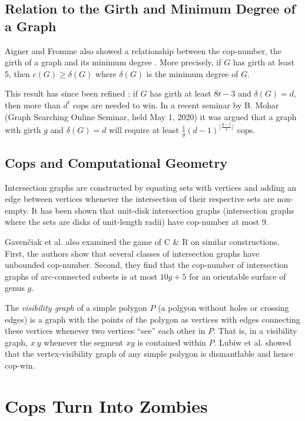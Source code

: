 \subsection{Relation to the Girth and Minimum Degree of a Graph}

Aigner and Fromme also showed a relationship between the cop-number, the girth of a graph and
its minimum degree \cite{aigner1984game}. More precisely, if $G$ has girth at least 5, then $c(G)\geq \delta(G)$ where $\delta(G)$ is the minimum degree of $G$.

This result has since been refined \cite{frankl1987cops}: if $G$ has girth at least $8t-3$ and $\delta(G) = d$, then more than $d^t$ cops are needed to win. In a recent
seminar by B. Mohar (Graph Searching Online Seminar, held May 1, 2020) it was
argued that a graph with girth $g$ and $\delta(G)=d$ will require at least $\tfrac{1}{g}(d-1)^{\lfloor \frac{g-1}{4} \rfloor}$ cops.

\subsection{Cops and Computational Geometry}

Intersection graphs are constructed by equating sets with vertices and adding an edge between vertices whenever the intersection of their respective sets are non-empty. It has been shown \cite{beveridge2011cops} that unit-disk intersection graphs (intersection graphs where the sets are disks of unit-length radii) have cop-number at most 9.

Gaven{\v{c}}iak et al. \cite{gavenvciak2018cops} also examined the game of C \& R on similar constructions. First, the authors show that several classes of intersection graphs have unbounded cop-number. Second, they find that the cop-number of intersection graphs of arc-connected subsets is at most $10g+5$ for an orientable surface of genus $g$.

The \textit{visibility graph} of a simple polygon $P$ (a polgyon without holes or crossing edges) is a graph with the points of the polygon as vertices with edges connecting these vertices whenever two vertices ``see'' each other in $P$. That is, in a visibility graph, $x ~ y$ whenever the segment $xy$ is contained within $P$.
Lubiw et al. \cite{lubiw2017visibility} showed that the vertex-visibility graph of any simple polygon is dismantlable and hence cop-win.

\section{Cops Turn Into Zombies}

